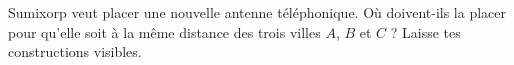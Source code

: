 %
%
    Sumixorp veut placer une nouvelle antenne téléphonique. Où doivent-ils la
    placer pour qu'elle soit à la même distance des trois villes $A$, $B$ et $C$ ?
    Laisse tes constructions visibles.
    \begin{center}
        
    \end{center}
